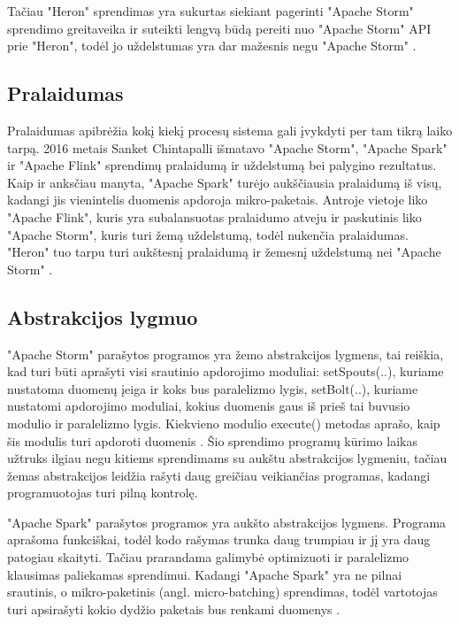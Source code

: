 \documentclass{VUMIFPSbakalaurinis}
\begin{document}
Tačiau "Heron" sprendimas yra sukurtas siekiant pagerinti "Apache Storm" sprendimo greitaveika ir suteikti lengvą būdą pereiti nuo "Apache Storm" API prie "Heron", todėl jo uždelstumas yra dar mažesnis negu "Apache Storm" \cite{Kulkarni:2015:THS:2723372.2742788}.

\subsection{Pralaidumas}

Pralaidumas apibrėžia kokį kiekį procesų sistema gali įvykdyti per tam tikrą laiko tarpą. 2016 metais Sanket Chintapalli \cite{chintapalli2016benchmarking} išmatavo "Apache Storm", "Apache Spark" ir "Apache Flink" sprendimų pralaidumą ir uždelstumą bei palygino rezultatus. Kaip ir anksčiau manyta, "Apache Spark" turėjo aukščiausia pralaidumą iš visų, kadangi jis vienintelis duomenis apdoroja mikro-paketais. Antroje vietoje liko "Apache Flink", kuris yra subalansuotas
pralaidumo atveju ir paskutinis liko "Apache Storm", kuris turi žemą uždelstumą, todėl nukenčia pralaidumas. "Heron" tuo tarpu turi aukštesnį pralaidumą ir žemesnį uždelstumą nei "Apache Storm" \cite{TwitterHeron}. 

\subsection{Abstrakcijos lygmuo}

"Apache Storm" parašytos programos yra žemo abstrakcijos lygmens, tai reiškia, kad turi būti aprašyti visi srautinio apdorojimo moduliai: 
setSpouts(..), kuriame nustatoma duomenų įeiga ir koks bus paralelizmo lygis, setBolt(..), kuriame nustatomi apdorojimo moduliai, kokius duomenis gaus iš prieš tai buvusio modulio ir paralelizmo lygis. Kiekvieno modulio execute() metodas aprašo, kaip šis modulis turi apdoroti duomenis \cite{tutpoint}. Šio sprendimo programų kūrimo laikas užtruks ilgiau negu kitiems sprendimams su aukštu abstrakcijos lygmeniu, tačiau žemas abstrakcijos leidžia rašyti daug greičiau veikiančias programas, kadangi programuotojas turi pilną kontrolę. \par

"Apache Spark" parašytos programos yra aukšto abstrakcijos lygmens. Programa aprašoma funkciškai, todėl kodo rašymas trunka daug trumpiau ir jį yra daug patogiau skaityti. Tačiau prarandama galimybė optimizuoti ir paralelizmo klausimas paliekamas sprendimui. Kadangi "Apache Spark" yra ne pilnai srautinis, o mikro-paketinis (angl. micro-batching) sprendimas, todėl vartotojas turi apsirašyti kokio dydžio paketais bus renkami duomenys \cite{shoro2015big}. \par
\end{document}
